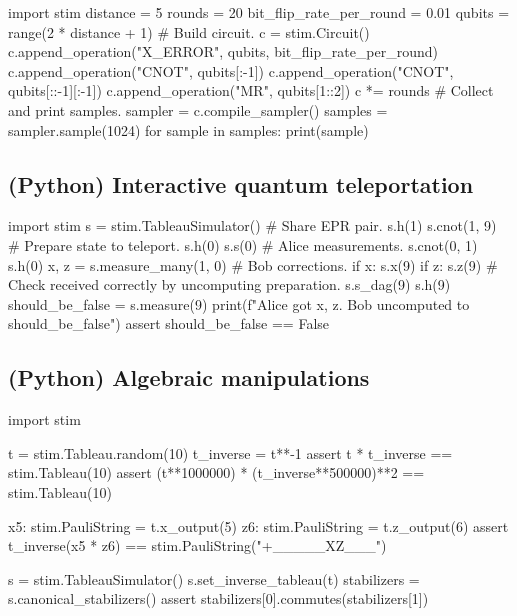 \documentclass[onecolumn,unpublished]{quantumarticle}
\theoremstyle{definition}
\theoremstyle{definition}
\theoremstyle{definition}
\begin{document}
\begin{python}
    import stim
    distance = 5
    rounds = 20
    bit_flip_rate_per_round = 0.01
    qubits = range(2 * distance + 1)
    # Build circuit.
    c = stim.Circuit()
    c.append_operation("X_ERROR", qubits, bit_flip_rate_per_round)
    c.append_operation("CNOT", qubits[:-1])
    c.append_operation("CNOT", qubits[::-1][:-1])
    c.append_operation("MR", qubits[1::2])
    c *= rounds
    # Collect and print samples.
    sampler = c.compile_sampler()
    samples = sampler.sample(1024)
    for sample in samples: print(sample)
\end{python}

\subsection{(Python) Interactive quantum teleportation}

\begin{python}
    import stim
    s = stim.TableauSimulator()
    # Share EPR pair.
    s.h(1)
    s.cnot(1, 9)
    # Prepare state to teleport.
    s.h(0)
    s.s(0)
    # Alice measurements.
    s.cnot(0, 1)
    s.h(0)
    x, z = s.measure_many(1, 0)
    # Bob corrections.
    if x: s.x(9)
    if z: s.z(9)
    # Check received correctly by uncomputing preparation.
    s.s_dag(9)
    s.h(9)
    should_be_false = s.measure(9)
    print(f"Alice got {x}, {z}. Bob uncomputed to {should_be_false}")
    assert should_be_false == False
\end{python}

\subsection{(Python) Algebraic manipulations}

\begin{python}
    import stim

    t = stim.Tableau.random(10)
    t_inverse = t**-1
    assert t * t_inverse == stim.Tableau(10)
    assert (t**1000000) * (t_inverse**500000)**2 == stim.Tableau(10)

    x5: stim.PauliString = t.x_output(5)
    z6: stim.PauliString = t.z_output(6)
    assert t_inverse(x5 * z6) == stim.PauliString("+_____XZ___")
    
    s = stim.TableauSimulator()
    s.set_inverse_tableau(t)
    stabilizers = s.canonical_stabilizers()
    assert stabilizers[0].commutes(stabilizers[1])
\end{python}
\end{document}
